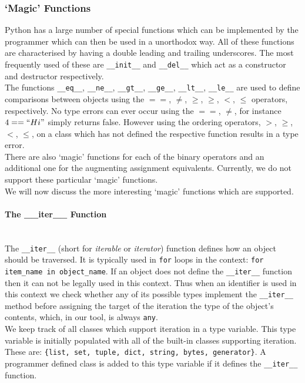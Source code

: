 \documentclass[12pt, titlepage]{article}
\begin{document}
\subsubsection{`Magic' Functions}
Python has a large number of special functions which can be implemented by the programmer which can then be used in a unorthodox way. All of these functions are characterised by having a double leading and trailing underscores. The most frequently used of these are \texttt{\_\_init\_\_} and \texttt{\_\_del\_\_} which act as a constructor and destructor respectively. \\
\indent The functions \texttt{\_\_eq\_\_}, \texttt{\_\_ne\_\_}, \texttt{\_\_gt\_\_}, \texttt{\_\_ge\_\_}, \texttt{\_\_lt\_\_}, \texttt{\_\_le\_\_} are used to define comparisons between objects using the $==$, $\neq$, $\ge$, $\geq$, $<$, $\leq$ operators, respectively. No type errors can ever occur using the $==$, $\neq$, for instance $4 == ``Hi"$ simply returns false. However using the ordering operators, $>$, $\geq$, $<$, $\leq$, on a class which has not defined the respective function results in a type error. \\
\indent There are also `magic' functions for each of the binary operators and an additional one for the augmenting assignment equivalents. Currently, we do not support these particular `magic' functions. \\
\indent We will now discuss the more interesting `magic' functions which are supported.

\paragraph*{The \_\_iter\_\_ Function}\mbox{} \\
The \texttt{\_\_iter\_\_} (short for \textit{iterable} or \textit{iterator}) function defines how an object should be traversed. It is typically used in \texttt{for} loops in the context: \texttt{for item\_name in object\_name}. If an object does not define the \texttt{\_\_iter\_\_} function then it can not be legally used in this context. Thus when an identifier is used in this context we check whether any of its possible types implement the \texttt{\_\_iter\_\_} method before assigning the target of the iteration the type of the object's contents, which, in our tool, is always \texttt{any}. \\
\indent We keep track of all classes which support iteration in a type variable. This type variable is initially populated with all of the built-in classes supporting iteration. These are: \texttt{\{list, set, tuple, dict, string, bytes, generator\}}. A programmer defined class is added to this type variable if it defines the \texttt{\_\_iter\_\_} function.
\end{document}
